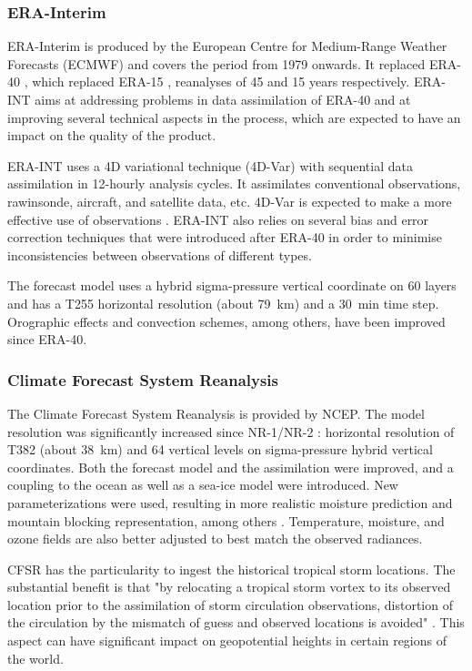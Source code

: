 \documentclass{ametsoc}
\begin{document}
\subsubsection{ERA-Interim}

ERA-Interim \citep[ERA-INT, ][]{Dee2011a} is produced by the European Centre for Medium-Range Weather Forecasts (ECMWF) and covers the period from 1979 onwards. It replaced ERA-40 \citep{Uppala2005}, which replaced ERA-15 \citep{Gibson1997}, reanalyses of 45 and 15 years respectively. ERA-INT aims at addressing problems in data assimilation of ERA-40 and at improving several technical aspects in the process, which are expected to have an impact on the quality of the product.

ERA-INT uses a 4D variational technique (4D-Var) with sequential data assimilation in 12-hourly analysis cycles. It assimilates conventional observations, rawinsonde, aircraft, and satellite data, etc. 4D-Var is expected to make a more effective use of observations \citep{Dee2011a}. ERA-INT also relies on several bias and error correction techniques that were introduced after ERA-40 in order to minimise inconsistencies between observations of different types.

The forecast model uses a hybrid sigma-pressure vertical coordinate on 60 layers and has a T255 horizontal resolution (about 79~km) and a 30~min time step. Orographic effects and convection schemes, among others, have been improved since ERA-40.


\subsubsection{Climate Forecast System Reanalysis}

The Climate Forecast System Reanalysis \citep[CFSR, ][]{Saha2010a} is provided by NCEP. The model resolution was significantly increased since NR-1/NR-2 : horizontal resolution of T382 (about 38~km) and 64 vertical levels on sigma-pressure hybrid vertical coordinates. Both the forecast model and the assimilation were improved, and a coupling to the ocean as well as a sea-ice model were introduced. New parameterizations were used, resulting in more realistic moisture prediction and mountain blocking representation, among others \citep{Saha2010a}. Temperature, moisture, and ozone fields are also better adjusted to best match the observed radiances.

CFSR has the particularity to ingest the historical tropical storm locations. The substantial benefit is that "by relocating a tropical storm vortex to its observed location prior to the assimilation of storm circulation observations, distortion of the circulation by the mismatch of guess and observed locations is avoided" \citep{Saha2010a}. This aspect can have significant impact on geopotential heights in certain regions of the world.
\end{document}
